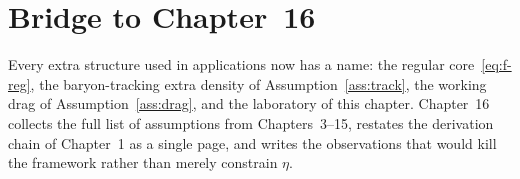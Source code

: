 \section{Bridge to Chapter~16}
\label{sec:ch15-bridge}

Every extra structure used in applications now has a name:
the regular core~\eqref{eq:f-reg}, the baryon-tracking extra
density of Assumption~\ref{ass:track}, the working drag of
Assumption~\ref{ass:drag}, and the laboratory of this chapter.
Chapter~16 collects the full list of assumptions from
Chapters~3--15, restates the derivation chain of Chapter~1 as a
single page, and writes the observations that would kill the
framework rather than merely constrain \(\eta\).